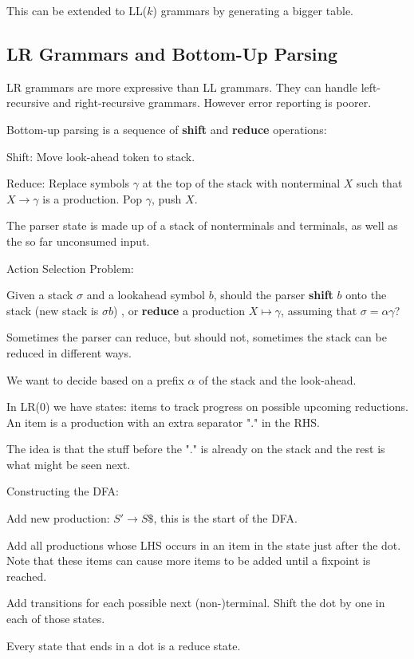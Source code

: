 This can be extended to LL($k$) grammars by generating a bigger table.


\subsection*{LR Grammars and Bottom-Up Parsing}

LR grammars are more expressive than LL grammars. They can handle left-recursive and right-recursive grammars. However error reporting is poorer. \medskip

Bottom-up parsing is a sequence of \textbf{shift} and \textbf{reduce} operations:
\begin{compactitem}
	\item Shift: Move look-ahead token to stack.

	\item Reduce: Replace symbols $\gamma$ at the top of the stack with nonterminal $X$ such that $X \to \gamma$ is a production. Pop $\gamma$, push $X$.
\end{compactitem}

The parser state is made up of a stack of nonterminals and terminals, as well as the so far unconsumed input.\medskip

Action Selection Problem:
\begin{compactitem}
	\item Given a stack $\sigma$ and a lookahead symbol $b$, should the parser \textbf{shift} $b$ onto the stack (new stack is $\sigma b$) , or \textbf{reduce} a production $X \mapsto \gamma$, assuming that $\sigma = \alpha \gamma$?

	\item Sometimes the parser can reduce, but should not, sometimes the stack can be reduced in different ways.
\end{compactitem}

We want to decide based on a prefix $\alpha$ of the stack and the look-ahead. \medskip

In LR(0) we have states: items to track progress on possible upcoming reductions. An item is a production with an extra separator "." in the RHS. \medskip

The idea is that the stuff before the "." is already on the stack and the rest is what might be seen next. \medskip

Constructing the DFA:
\begin{compactitem}
	\item Add new production: $S' \to S\$$, this is the start of the DFA.

	\item Add all productions whose LHS occurs in an item in the state just after the dot. Note that these items can cause more items to be added until a fixpoint is reached.

	\item Add transitions for each possible next (non-)terminal. Shift the dot by one in each of those states.

	\item Every state that ends in a dot is a reduce state.
\end{compactitem}

